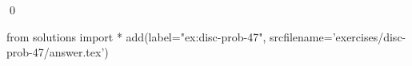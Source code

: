 
\begin{ex} 
  \label{ex:disc-prob-47}
  
  \qed
\end{ex} 
\begin{python0}
from solutions import *
add(label="ex:disc-prob-47",
    srcfilename='exercises/disc-prob-47/answer.tex') 
\end{python0}
